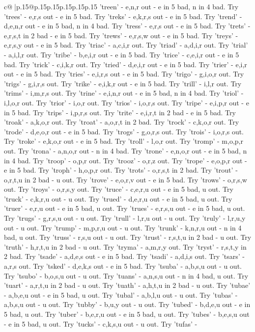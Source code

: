 \documentclass{article}
\begin{document}
{\begin{supertabular}{c@{$\;$}|p{.15\linewidth}@{}p{.15\linewidth}p{.15\linewidth}p{.15\linewidth}p{.15\linewidth}p{.15\linewidth}}
{{{'treen' {-} e,n,r out {-} e in 5 bad, n in 4 bad. Try 'trees' {-} e,r,s out {-} e in 5 bad. Try 'treks' {-} e,k,r,s out {-} e in 5 bad. Try 'trend' {-} d,e,n,r out {-} e in 5 bad, n in 4 bad. Try 'tress' {-} e,r,s out {-} e in 5 bad. Try 'trets' {-} e,r,s,t in 2 bad {-} e in 5 bad. Try 'trews' {-} e,r,s,w out {-} e in 5 bad. Try 'treys' {-} e,r,s,y out {-} e in 5 bad. Try 'triac' {-} a,c,i,r out. Try 'triad' {-} a,d,i,r out. Try 'trial' {-} a,i,l,r out. Try 'tribe' {-} b,e,i,r out {-} e in 5 bad. Try 'trice' {-} c,e,i,r out {-} e in 5 bad. Try 'trick' {-} c,i,k,r out. Try 'tried' {-} d,e,i,r out {-} e in 5 bad. Try 'trier' {-} e,i,r out {-} e in 5 bad. Try 'tries' {-} e,i,r,s out {-} e in 5 bad. Try 'trigo' {-} g,i,o,r out. Try 'trigs' {-} g,i,r,s out. Try 'trike' {-} e,i,k,r out {-} e in 5 bad. Try 'trill' {-} i,l,r out. Try 'trims' {-} i,m,r,s out. Try 'trine' {-} e,i,n,r out {-} e in 5 bad, n in 4 bad. Try 'triol' {-} i,l,o,r out. Try 'trior' {-} i,o,r out. Try 'trios' {-} i,o,r,s out. Try 'tripe' {-} e,i,p,r out {-} e in 5 bad. Try 'trips' {-} i,p,r,s out. Try 'trite' {-} e,i,r,t in 2 bad {-} e in 5 bad. Try 'troak' {-} a,k,o,r out. Try 'troat' {-} a,o,r,t in 2 bad. Try 'trock' {-} c,k,o,r out. Try 'trode' {-} d,e,o,r out {-} e in 5 bad. Try 'trogs' {-} g,o,r,s out. Try 'trois' {-} i,o,r,s out. Try 'troke' {-} e,k,o,r out {-} e in 5 bad. Try 'troll' {-} l,o,r out. Try 'tromp' {-} m,o,p,r out. Try 'trona' {-} a,n,o,r out {-} n in 4 bad. Try 'trone' {-} e,n,o,r out {-} e in 5 bad, n in 4 bad. Try 'troop' {-} o,p,r out. Try 'trooz' {-} o,r,z out. Try 'trope' {-} e,o,p,r out {-} e in 5 bad. Try 'troph' {-} h,o,p,r out. Try 'trots' {-} o,r,s,t in 2 bad. Try 'trout' {-} o,r,t,u in 2 bad {-} u out. Try 'trove' {-} e,o,r,v out {-} e in 5 bad. Try 'trows' {-} o,r,s,w out. Try 'troys' {-} o,r,s,y out. Try 'truce' {-} c,e,r,u out {-} e in 5 bad, u out. Try 'truck' {-} c,k,r,u out {-} u out. Try 'trued' {-} d,e,r,u out {-} e in 5 bad, u out. Try 'truer' {-} e,r,u out {-} e in 5 bad, u out. Try 'trues' {-} e,r,s,u out {-} e in 5 bad, u out. Try 'trugs' {-} g,r,s,u out {-} u out. Try 'trull' {-} l,r,u out {-} u out. Try 'truly' {-} l,r,u,y out {-} u out. Try 'trump' {-} m,p,r,u out {-} u out. Try 'trunk' {-} k,n,r,u out {-} n in 4 bad, u out. Try 'truss' {-} r,s,u out {-} u out. Try 'trust' {-} r,s,t,u in 2 bad {-} u out. Try 'truth' {-} h,r,t,u in 2 bad {-} u out. Try 'tryma' {-} a,m,r,y out. Try 'tryst' {-} r,s,t,y in 2 bad. Try 'tsade' {-} a,d,e,s out {-} e in 5 bad. Try 'tsadi' {-} a,d,i,s out. Try 'tsars' {-} a,r,s out. Try 'tsked' {-} d,e,k,s out {-} e in 5 bad. Try 'tsuba' {-} a,b,s,u out {-} u out. Try 'tsubo' {-} b,o,s,u out {-} u out. Try 'tuans' {-} a,n,s,u out {-} n in 4 bad, u out. Try 'tuart' {-} a,r,t,u in 2 bad {-} u out. Try 'tuath' {-} a,h,t,u in 2 bad {-} u out. Try 'tubae' {-} a,b,e,u out {-} e in 5 bad, u out. Try 'tubal' {-} a,b,l,u out {-} u out. Try 'tubas' {-} a,b,s,u out {-} u out. Try 'tubby' {-} b,u,y out {-} u out. Try 'tubed' {-} b,d,e,u out {-} e in 5 bad, u out. Try 'tuber' {-} b,e,r,u out {-} e in 5 bad, u out. Try 'tubes' {-} b,e,s,u out {-} e in 5 bad, u out. Try 'tucks' {-} c,k,s,u out {-} u out. Try 'tufas' {-} }}}
\end{supertabular}}
\end{document}
